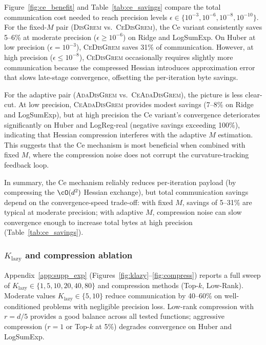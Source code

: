 \documentclass[review,onefignum,onetabnum]{siamart171218}
\begin{document}
	Figure~\ref{fig:ce_benefit} and Table~\ref{tab:ce_savings} compare
	the total communication cost needed to reach precision levels $\epsilon\in\{10^{-3},10^{-6},10^{-8},10^{-10}\}$.
	For the fixed-$M$ pair (\textsc{DisGrem} vs.\ \textsc{CeDisGrem}), the Ce variant
	consistently saves 5--6\% at moderate precision ($\epsilon \ge 10^{-6}$)
	on Ridge and LogSumExp.
	On Huber at low precision ($\epsilon{=}10^{-3}$), \textsc{CeDisGrem} saves
	31\% of communication.
	However, at high precision ($\epsilon \le 10^{-8}$), \textsc{CeDisGrem}
	occasionally requires slightly more communication because the
	compressed Hessian introduces approximation error that slows late-stage
	convergence, offsetting the per-iteration byte savings.
	
	For the adaptive pair (\textsc{AdaDisGrem} vs.\ \textsc{CeAdaDisGrem}), the picture is
	less clear-cut.
	At low precision, \textsc{CeAdaDisGrem} provides modest savings (7--8\% on
	Ridge and LogSumExp), but at high precision the Ce variant's
	convergence deteriorates significantly on Huber and LogReg-real
	(negative savings exceeding 100\%), indicating that Hessian
	compression interferes with the adaptive $M$ estimation.
	This suggests that the Ce mechanism is most beneficial when combined
	with fixed $M$, where the compression noise does not corrupt the
	curvature-tracking feedback loop.
	
	In summary, the Ce mechanism reliably reduces
	per-iteration payload (by compressing the $\cO(d^2)$
	Hessian exchange), but total communication savings depend on
	the convergence-speed trade-off: with fixed $M$, savings of
	5--31\% are typical at moderate precision; with adaptive $M$,
	compression noise can slow convergence enough to increase
	total bytes at high precision (Table~\ref{tab:ce_savings}).
	
	\subsubsection{$K_{\mathrm{lazy}}$ and compression ablation}
	
	Appendix~\ref{app:supp_exp} (Figures~\ref{fig:klazy}--\ref{fig:compress})
	reports a full sweep of $K_{\mathrm{lazy}}\in\{1,5,10,20,40,80\}$
	and compression methods (Top-$k$, Low-Rank).
	Moderate values $K_{\mathrm{lazy}}\in\{5,10\}$ reduce
	communication by 40--60\% on well-conditioned problems with
	negligible precision loss.
	Low-rank compression with $r{=}d/5$ provides a good balance
	across all tested functions; aggressive compression ($r{=}1$ or
	Top-$k$ at 5\%) degrades convergence on Huber and LogSumExp.
	
\end{document}
